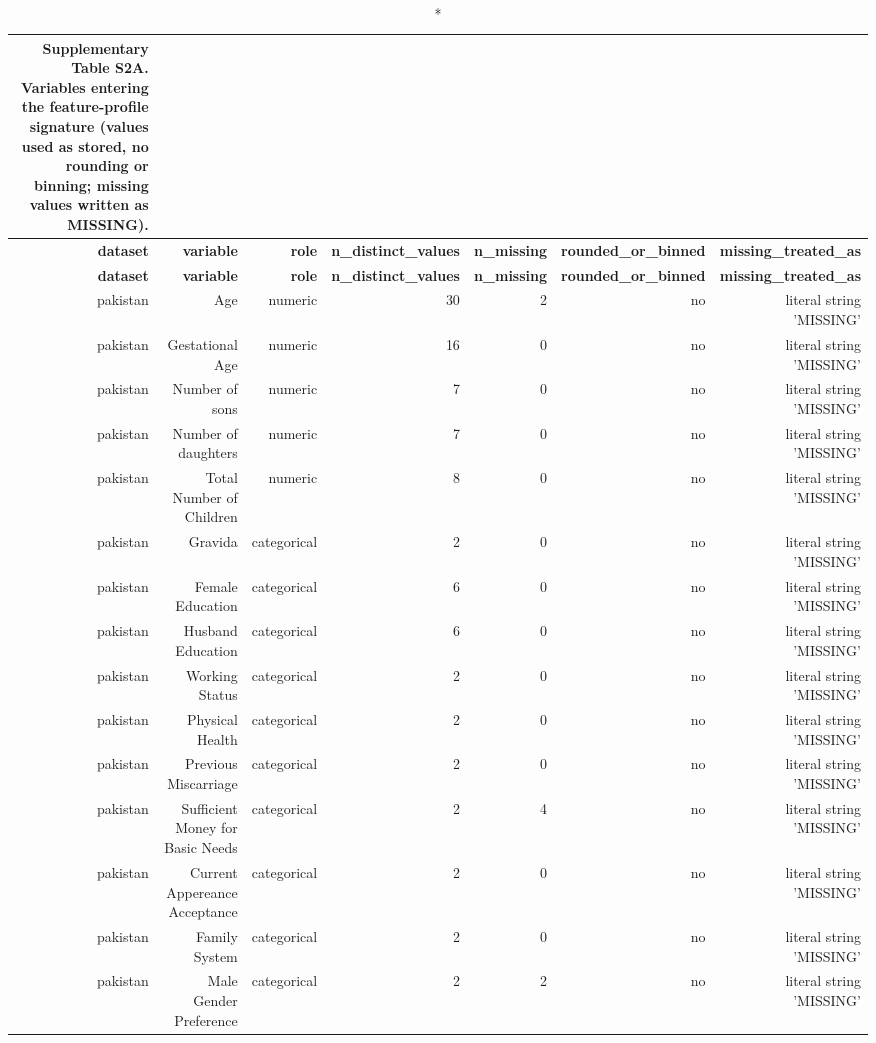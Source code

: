 \documentclass[10pt]{article}
\begin{document}
\tiny
\setlength{\tabcolsep}{2pt}
\begin{longtable}{rrrrrrr}
\caption*{\textbf{Supplementary Table S2A.} Variables entering the feature-profile signature (values used as stored, no rounding or binning; missing values written as MISSING).}\\
\toprule
\textbf{dataset} & \textbf{variable} & \textbf{role} & \textbf{n\_distinct\_values} & \textbf{n\_missing} & \textbf{rounded\_or\_binned} & \textbf{missing\_treated\_as} \\
\midrule
\endfirsthead
\toprule
\textbf{dataset} & \textbf{variable} & \textbf{role} & \textbf{n\_distinct\_values} & \textbf{n\_missing} & \textbf{rounded\_or\_binned} & \textbf{missing\_treated\_as} \\
\midrule
\endhead
\bottomrule
\endfoot
pakistan & Age & numeric & 30 & 2 & no & literal string 'MISSING' \\
pakistan & Gestational Age & numeric & 16 & 0 & no & literal string 'MISSING' \\
pakistan & Number of sons  & numeric & 7 & 0 & no & literal string 'MISSING' \\
pakistan & Number of daughters & numeric & 7 & 0 & no & literal string 'MISSING' \\
pakistan & Total Number of Children & numeric & 8 & 0 & no & literal string 'MISSING' \\
pakistan & Gravida & categorical & 2 & 0 & no & literal string 'MISSING' \\
pakistan & Female Education & categorical & 6 & 0 & no & literal string 'MISSING' \\
pakistan & Husband Education & categorical & 6 & 0 & no & literal string 'MISSING' \\
pakistan & Working Status & categorical & 2 & 0 & no & literal string 'MISSING' \\
pakistan & Physical Health  & categorical & 2 & 0 & no & literal string 'MISSING' \\
pakistan & Previous Miscarriage & categorical & 2 & 0 & no & literal string 'MISSING' \\
pakistan & Sufficient Money for Basic Needs & categorical & 2 & 4 & no & literal string 'MISSING' \\
pakistan & Current Appereance Acceptance & categorical & 2 & 0 & no & literal string 'MISSING' \\
pakistan & Family System & categorical & 2 & 0 & no & literal string 'MISSING' \\
pakistan & Male Gender Preference & categorical & 2 & 2 & no & literal string 'MISSING' \\

\end{longtable}
\end{document}

